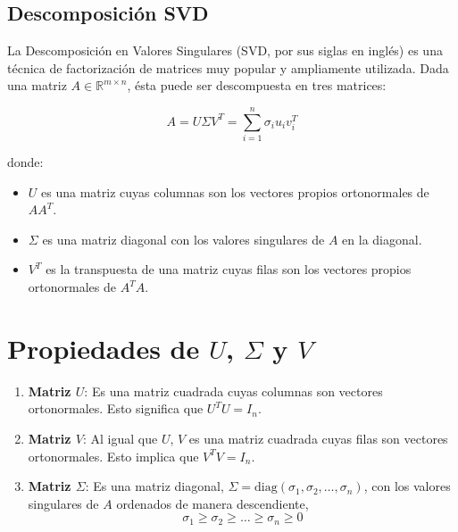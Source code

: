 \documentclass[12pt, oneside]{book}
\begin{document}
	\subsection{Descomposición SVD}
	La Descomposición en Valores Singulares (SVD, por sus siglas en inglés) es una técnica de factorización de matrices muy popular y ampliamente utilizada. Dada una matriz $A \in \mathbb{R}^{m \times n}$, ésta puede ser descompuesta en tres matrices:
	
	\[
	A = U \Sigma V^T = \sum_{i=1}^{n} \sigma_i u_i v_i^T
	\]
	
	donde:
	
	\begin{itemize}
		\item \( U \) es una matriz cuyas columnas son los vectores propios ortonormales de \( A A^T \).
		\item \( \Sigma \) es una matriz diagonal con los valores singulares de \( A \) en la diagonal.
		\item \( V^T \) es la transpuesta de una matriz cuyas filas son los vectores propios ortonormales de \( A^T A \).
	\end{itemize}
	
	\section*{Propiedades de \( U \), \( \Sigma \) y \( V \)}
	
	\begin{enumerate}
		\item \textbf{Matriz \( U \)}: Es una matriz cuadrada cuyas columnas son vectores ortonormales. Esto significa que \( U^T U = I_n \).
		
		\item \textbf{Matriz \( V \)}: Al igual que \( U \), \( V \) es una matriz cuadrada cuyas filas son vectores ortonormales. Esto implica que \( V^T V = I_n \).
		
		\item \textbf{Matriz \( \Sigma \)}: Es una matriz diagonal, $ \Sigma  = \text{diag}(\sigma_1, \sigma_2, \dots, \sigma_n)$, con los valores singulares de $A$ ordenados de manera descendiente,
		\[
		\sigma_1 \geq \sigma_2 \geq \dots \geq \sigma_n \geq 0
		\]
		
	\end{enumerate}
	
\end{document}
